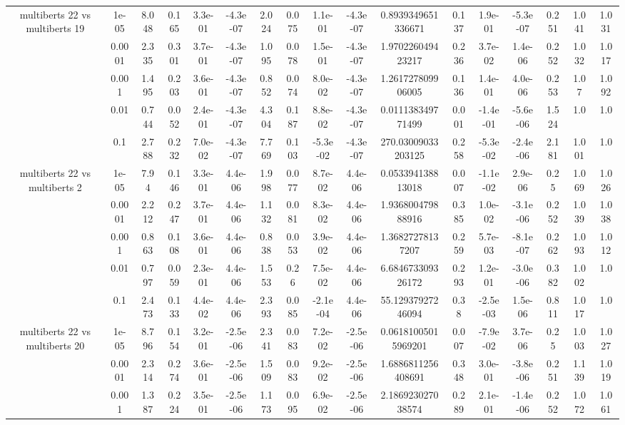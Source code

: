 \begin{tabular}{|c|c|c|c|c|c|c|c|c|c|c|c|c|c|c|c|c|}
\hline
\multirow{5}{*}{multiberts 22 vs multiberts 19} & 1e-05 & 8.048 & 0.165 & 3.3e-01 & -4.3e-07 & 2.024 & 0.075 & 1.1e-01 & -4.3e-07 & 0.8939349651336671 & 0.137 & 1.9e-01 & -5.3e-07 & 0.251 & 1.041 & 1.031 \\
 & 0.0001 & 2.335 & 0.301 & 3.7e-01 & -4.3e-07 & 1.095 & 0.078 & 1.5e-01 & -4.3e-07 & 1.970226049423217 & 0.236 & 3.7e-02 & 1.4e-06 & 0.252 & 1.032 & 1.017 \\
 & 0.001 & 1.495 & 0.203 & 3.6e-01 & -4.3e-07 & 0.852 & 0.074 & 8.0e-02 & -4.3e-07 & 1.261727809906005 & 0.136 & 1.4e-01 & 4.0e-06 & 0.253 & 1.07 & 1.092 \\
 & 0.01 & 0.744 & 0.052 & 2.4e-01 & -4.3e-07 & 4.304 & 0.187 & 8.8e-02 & -4.3e-07 & 0.011138349771499 & 0.001 & -1.4e-01 & -5.6e-06 & 1.524 & 1.0 & 1.0 \\
 & 0.1 & 2.788 & 0.232 & 7.0e-02 & -4.3e-07 & 7.769 & 0.103 & -5.3e-02 & -4.3e-07 & 270.03009033203125 & 0.258 & -5.3e-02 & -2.4e-06 & 2.181 & 1.001 & 1.0 \\
\hline
\multirow{5}{*}{multiberts 22 vs multiberts 2} & 1e-05 & 7.94 & 0.146 & 3.3e-01 & 4.4e-06 & 1.998 & 0.077 & 8.7e-02 & 4.4e-06 & 0.053394138813018 & 0.007 & -1.1e-02 & 2.9e-06 & 0.25 & 1.069 & 1.026 \\
 & 0.0001 & 2.212 & 0.247 & 3.7e-01 & 4.4e-06 & 1.132 & 0.081 & 8.3e-02 & 4.4e-06 & 1.936800479888916 & 0.385 & 1.0e-02 & -3.1e-06 & 0.252 & 1.039 & 1.038 \\
 & 0.001 & 0.863 & 0.108 & 3.6e-01 & 4.4e-06 & 0.838 & 0.053 & 3.9e-02 & 4.4e-06 & 1.36827278137207 & 0.259 & 5.7e-03 & -8.1e-07 & 0.262 & 1.093 & 1.012 \\
 & 0.01 & 0.797 & 0.059 & 2.3e-01 & 4.4e-06 & 1.553 & 0.26 & 7.5e-02 & 4.4e-06 & 6.684673309326172 & 0.293 & 1.2e-01 & -3.0e-06 & 0.382 & 1.002 & 1.0 \\
 & 0.1 & 2.473 & 0.133 & 4.4e-02 & 4.4e-06 & 2.393 & 0.085 & -2.1e-04 & 4.4e-06 & 55.12937927246094 & 0.38 & -2.5e-03 & 1.5e-06 & 0.811 & 1.017 & 1.0 \\
\hline
\multirow{5}{*}{multiberts 22 vs multiberts 20} & 1e-05 & 8.796 & 0.154 & 3.2e-01 & -2.5e-06 & 2.341 & 0.083 & 7.2e-02 & -2.5e-06 & 0.06181005015969201 & 0.007 & -7.9e-02 & 3.7e-06 & 0.25 & 1.003 & 1.027 \\
 & 0.0001 & 2.314 & 0.274 & 3.6e-01 & -2.5e-06 & 1.509 & 0.083 & 9.2e-02 & -2.5e-06 & 1.6886811256408691 & 0.348 & 3.0e-01 & -3.8e-06 & 0.251 & 1.139 & 1.019 \\
 & 0.001 & 1.387 & 0.224 & 3.5e-01 & -2.5e-06 & 1.173 & 0.095 & 6.9e-02 & -2.5e-06 & 2.186923027038574 & 0.289 & 2.1e-01 & -1.4e-06 & 0.252 & 1.072 & 1.061 \\

\end{tabular}
